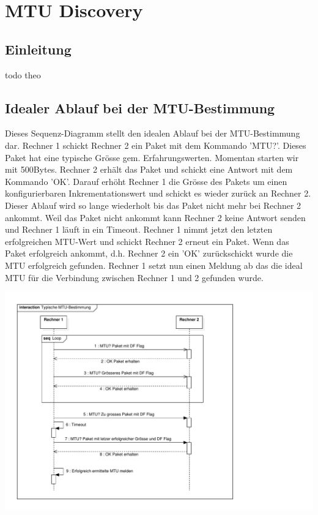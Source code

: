\section{MTU Discovery}
\label{sec:MTU Discovery}

\subsection{Einleitung}
todo theo

\subsection{Idealer Ablauf bei der MTU-Bestimmung}
Dieses Sequenz-Diagramm stellt den idealen Ablauf bei der MTU-Bestimmung dar. Rechner 1 schickt Rechner 2 ein Paket mit dem Kommando 'MTU?'. Dieses Paket hat eine typische Grösse gem. Erfahrungswerten. Momentan starten wir mit 500Bytes. %
Rechner 2 erhält das Paket und schickt eine Antwort mit dem Kommando 'OK'. Darauf erhöht Rechner 1
die Grösse des Pakets um einen konfigurierbaren Inkrementationswert und schickt es wieder zurück an
Rechner 2. Dieser Ablauf wird so lange wiederholt bis das Paket nicht mehr bei Rechner 2 ankommt.
Weil das Paket nicht ankommt kann Rechner 2 keine Antwort senden und Rechner 1 läuft in ein Timeout.
Rechner 1 nimmt jetzt den letzten erfolgreichen MTU-Wert und schickt Rechner 2 erneut ein Paket.
Wenn das Paket erfolgreich ankommt, d.h. Rechner 2 ein 'OK' zurückschickt wurde die MTU erfolgreich gefunden. Rechner 1 setzt nun einen Meldung ab das die ideal MTU für die Verbindung zwischen Rechner 1 und 2 gefunden wurde.

\includegraphics[trim=10 10 200 10,clip,width=\textwidth]{mainpart/implementation/img/typischeMTUBestimmung}